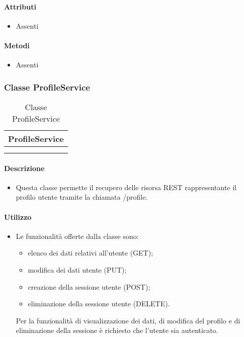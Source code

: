 \paragraph*{Attributi}
\begin{itemize}
\item[] Assenti
\end{itemize}

\paragraph*{Metodi}
\begin{itemize}
\item[] Assenti
\end{itemize}

\subsubsection{Classe ProfileService}

\begin{table}[ht]
\begin{center}
\bgroup
\setlength{\arrayrulewidth}{0.6mm}
\def\arraystretch{1}
\begin{tabular}{ | p{12cm} | }
\hline
\centerline{\textbf{ProfileService}}
\\ \hline
 \\ 
\hline
 \\ 
\hline
\end{tabular}
\egroup
\caption{Classe ProfileService}
\end{center}
\end{table}

\paragraph*{Descrizione}
\begin{itemize}
\item[] Questa classe permette il recupero delle risorsa REST rappresentante il profilo utente tramite la chiamata /profile.
\end{itemize}

\paragraph*{Utilizzo}
\begin{itemize}
\item[] Le funzionalità offerte dalla classe sono:
\begin{itemize}
\item elenco dei dati relativi all'utente (GET);
\item modifica dei dati utente (PUT);
\item creazione della sessione utente (POST);
\item eliminazione della sessione utente (DELETE).
\end{itemize}

Per la funzionalità di visualizzazione dei dati, di modifica del profilo e di eliminazione della sessione è richiesto che l'utente sia autenticato.
\end{itemize}

